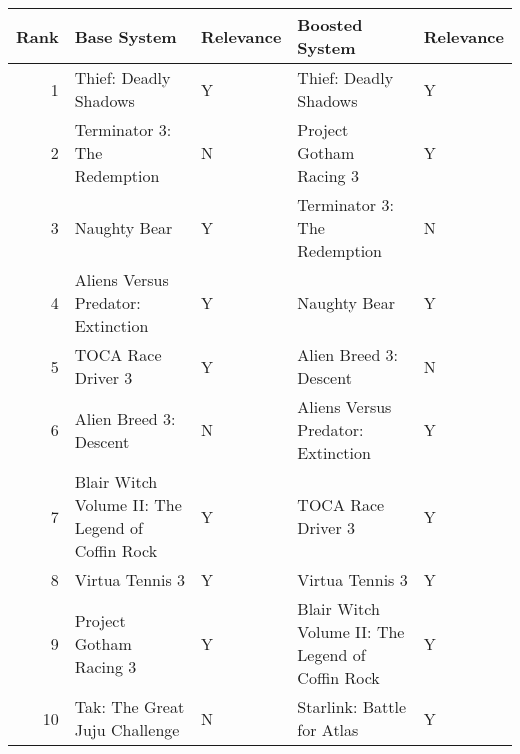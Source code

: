 \begin{tabular}{rllll}
\toprule
 Rank &                                      Base System & Relevance &                                   Boosted System & Relevance \\
\midrule
    1 &                            Thief: Deadly Shadows &         Y &                            Thief: Deadly Shadows &         Y \\
    2 &                     Terminator 3: The Redemption &         N &                          Project Gotham Racing 3 &         Y \\
    3 &                                     Naughty Bear &         Y &                     Terminator 3: The Redemption &         N \\
    4 &               Aliens Versus Predator: Extinction &         Y &                                     Naughty Bear &         Y \\
    5 &                               TOCA Race Driver 3 &         Y &                           Alien Breed 3: Descent &         N \\
    6 &                           Alien Breed 3: Descent &         N &               Aliens Versus Predator: Extinction &         Y \\
    7 & Blair Witch Volume II: The Legend of Coffin Rock &         Y &                               TOCA Race Driver 3 &         Y \\
    8 &                                  Virtua Tennis 3 &         Y &                                  Virtua Tennis 3 &         Y \\
    9 &                          Project Gotham Racing 3 &         Y & Blair Witch Volume II: The Legend of Coffin Rock &         Y \\
   10 &                    Tak: The Great Juju Challenge &         N &                       Starlink: Battle for Atlas &         Y \\
\bottomrule
\end{tabular}
